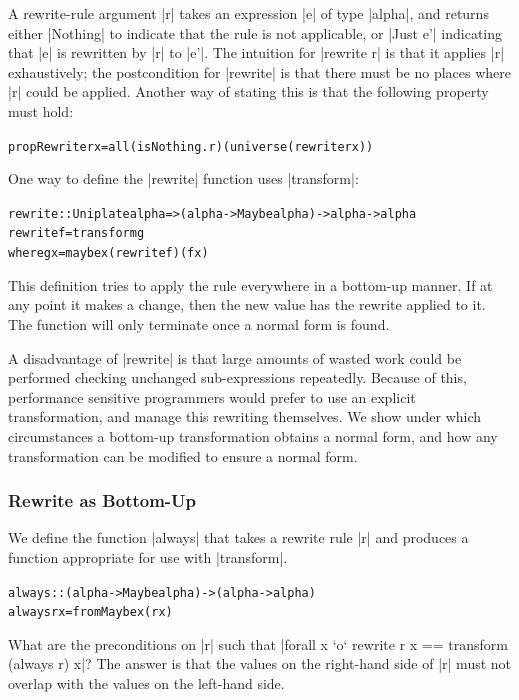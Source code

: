 \documentclass[preprint]{sigplanconf}
\newenvironment{code}{\begin{alltt}\small}{\end{alltt}}
\newcommand{\ignore}{}
\begin{document}
A rewrite-rule argument |r| takes an expression |e| of type |alpha|, and returns either |Nothing| to indicate that the rule is not applicable, or |Just e'| indicating that |e| is rewritten by |r| to |e'|. The intuition for |rewrite r| is that it applies |r| exhaustively; the postcondition for |rewrite| is that there must be no places where |r| could be applied. Another way of stating this is that the following property must hold:

\begin{code}
propRewrite r x = all (isNothing . r) (universe (rewrite r x))
\end{code}

One way to define the |rewrite| function uses |transform|:

\begin{code}
rewrite :: Uniplate alpha => (alpha -> Maybe alpha) -> alpha -> alpha
rewrite f = transform g
    where g x = maybe x (rewrite f) (f x)
\end{code}

This definition tries to apply the rule everywhere in a bottom-up manner. If at any point it makes a change, then the new value has the rewrite applied to it. The function will only terminate once a normal form is found.

A disadvantage of |rewrite| is that large amounts of wasted work could be performed checking unchanged sub-expressions repeatedly. Because of this, performance sensitive programmers would prefer to use an explicit transformation, and manage this rewriting themselves. We show under which circumstances a bottom-up transformation obtains a normal form, and how any transformation can be modified to ensure a normal form.

\subsubsection{Rewrite as Bottom-Up}
\label{sec:rewrite_bottom}

We define the function |always| that takes a rewrite rule |r| and produces a function appropriate for use with |transform|.

\begin{code}
always :: (alpha -> Maybe alpha) -> (alpha -> alpha)
always r x = fromMaybe x (r x)
\end{code}

What are the preconditions on |r| such that \ignore|forall x `o` rewrite r x == transform (always r) x|? The answer is that the values on the right-hand side of |r| must not overlap with the values on the left-hand side.
\end{document}
